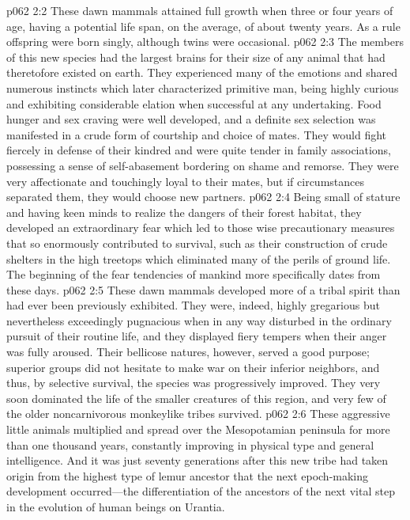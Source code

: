 \vs p062 2:2 These dawn mammals attained full growth when three or four years of age, having a potential life span, on the average, of about twenty years. As a rule offspring were born singly, although twins were occasional.
\vs p062 2:3 The members of this new species had the largest brains for their size of any animal that had theretofore existed on earth. They experienced many of the emotions and shared numerous instincts which later characterized primitive man, being highly curious and exhibiting considerable elation when successful at any undertaking. Food hunger and sex craving were well developed, and a definite sex selection was manifested in a crude form of courtship and choice of mates. They would fight fiercely in defense of their kindred and were quite tender in family associations, possessing a sense of self\hyp{}abasement bordering on shame and remorse. They were very affectionate and touchingly loyal to their mates, but if circumstances separated them, they would choose new partners.
\vs p062 2:4 Being small of stature and having keen minds to realize the dangers of their forest habitat, they developed an extraordinary fear which led to those wise precautionary measures that so enormously contributed to survival, such as their construction of crude shelters in the high treetops which eliminated many of the perils of ground life. The beginning of the fear tendencies of mankind more specifically dates from these days.
\vs p062 2:5 These dawn mammals developed more of a tribal spirit than had ever been previously exhibited. They were, indeed, highly gregarious but nevertheless exceedingly pugnacious when in any way disturbed in the ordinary pursuit of their routine life, and they displayed fiery tempers when their anger was fully aroused. Their bellicose natures, however, served a good purpose; superior groups did not hesitate to make war on their inferior neighbors, and thus, by selective survival, the species was progressively improved. They very soon dominated the life of the smaller creatures of this region, and very few of the older noncarnivorous monkeylike tribes survived.
\vs p062 2:6 These aggressive little animals multiplied and spread over the Mesopotamian peninsula for more than one thousand years, constantly improving in physical type and general intelligence. And it was just seventy generations after this new tribe had taken origin from the highest type of lemur ancestor that the next epoch\hyp{}making development occurred---the  differentiation of the ancestors of the next vital step in the evolution of human beings on Urantia.
